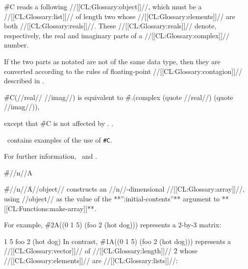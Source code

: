 \endsubsubsection%




\f{\#C} reads a following //[[CL:Glossary:object]]//, which must be a //[[CL:Glossary:list]]// of
length two whose //[[CL:Glossary:elements]]// are both //[[CL:Glossary:reals]]//.
These //[[CL:Glossary:reals]]// denote, respectively,
the real and imaginary parts of a //[[CL:Glossary:complex]]// number.


If the two parts as notated are not of the same data type,
then they are converted 
according to the rules of floating-point //[[CL:Glossary:contagion]]//
described in \secref\NumericContagionRules.

\f{\#C(//real// //imag//)} is equivalent to 
\f{\#.(complex (quote //real//) (quote //imag//))},

except that \f{\#C} is not affected by .
.

\Thenextfigure\ contains examples of the use of {\tt \#C}.


For further information, 
\seesection\PrintingComplexes\ and \secref\SyntaxOfComplexes.

\endsubsubsection%



\f{\#//n//A}

\f{\#//n//\f{A}//object//} constructs an //n//-dimensional //[[CL:Glossary:array]]//,
using //object// as the value of the **'':initial-contents''** argument
to **[[CL:Functions:make-array]]**.


For example, \f{\#2A((0 1 5) (foo 2 (hot dog)))} represents a 2-by-3 matrix:

       1       5
 foo     2       (hot dog)
\endcode
In contrast, \f{\#1A((0 1 5) (foo 2 (hot dog)))} 
represents a //[[CL:Glossary:vector]]// of //[[CL:Glossary:length]]// \f{2} 
whose //[[CL:Glossary:elements]]// are //[[CL:Glossary:lists]]//:

